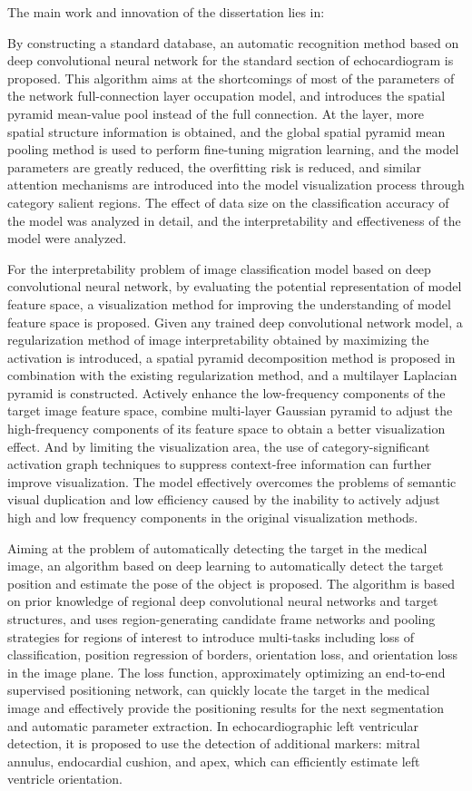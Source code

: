   The main work and innovation of the dissertation lies in:
  
  By constructing a standard  database, an automatic recognition method based on deep convolutional neural network for the standard section of echocardiogram is proposed. This algorithm aims at the shortcomings of most of the parameters of the network full-connection layer occupation model, and introduces the spatial pyramid mean-value pool instead of the full connection. 
  At the layer, more spatial structure information is obtained, and the global spatial pyramid mean pooling method is used to perform fine-tuning migration learning, and the model parameters are greatly reduced, the overfitting risk is reduced, and similar attention mechanisms are introduced into the model visualization process through category salient regions. The effect of data size on the classification accuracy of the model was analyzed in detail, and the interpretability and effectiveness of the model were analyzed.
  
  For the interpretability problem of image classification model based on deep convolutional neural network, by evaluating the potential representation of model feature space, a visualization method for improving the understanding of model feature space is proposed. Given any trained deep convolutional network model, a regularization method of image interpretability obtained by maximizing the activation is introduced, a spatial pyramid decomposition method is proposed in combination with the existing regularization method, and a multilayer Laplacian pyramid is constructed. Actively enhance the low-frequency components of the target image feature space, combine multi-layer Gaussian pyramid to adjust the high-frequency components of its feature space to obtain a better visualization effect. And by limiting the visualization area, the use of category-significant activation graph techniques to suppress context-free information can further improve visualization. The model effectively overcomes the problems of semantic visual duplication and low efficiency caused by the inability to actively adjust high and low frequency components in the original visualization methods.
  
  Aiming at the problem of automatically detecting the target in the medical image, an algorithm based on deep learning to automatically detect the target position and estimate the pose of the object is proposed. The algorithm is based on prior knowledge of regional deep convolutional neural networks and target structures, and uses region-generating candidate frame networks and pooling strategies for regions of interest to introduce multi-tasks including loss of classification, position regression of borders, orientation loss, and orientation loss in the image plane. The loss function, approximately optimizing an end-to-end supervised positioning network, can quickly locate the target in the medical image and effectively provide the positioning results for the next segmentation and automatic parameter extraction. In echocardiographic left ventricular detection, it is proposed to use the detection of additional markers: mitral annulus, endocardial cushion, and apex, which can efficiently estimate left ventricle orientation.
  
